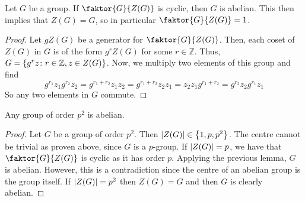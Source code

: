 \begin{lemma}
	Let \( G \) be a group.
	If \( \faktor{G}{Z(G)} \) is cyclic, then \( G \) is abelian.
	This then implies that \( Z(G) = G \), so in particular \( \faktor{G}{Z(G)} = 1 \).
\end{lemma}
\begin{proof}
	Let \( g Z(G) \) be a generator for \( \faktor{G}{Z(G)} \).
	Then, each coset of \( Z(G) \) in \( G \) is of the form \( g^r Z(G) \) for some \( r \in \mathbb Z \).
	Thus, \( G = \qty{g^r z \colon r \in \mathbb Z, z \in Z(G)} \).
	Now, we multiply two elements of this group and find
	\[ g^{r_1} z_1 g^{r_2} z_2 = g^{r_1 + r_2} z_1 z_2 = g^{r_1 + r_2} z_2 z_1 = z_2 z_1 g^{r_1 + r_2} = g^{r_2} z_2 g^{r_1} z_1 \]
	So any two elements in \( G \) commute.
\end{proof}
\begin{corollary}
	Any group of order \( p^2 \) is abelian.
\end{corollary}
\begin{proof}
	Let \( G \) be a group of order \( p^2 \).
	Then \( \abs{Z(G)} \in \qty{1, p, p^2} \).
	The centre cannot be trivial as proven above, since \( G \) is a \( p \)-group.
	If \( \abs{Z(G)} = p \), we have that \( \faktor{G}{Z(G)} \) is cyclic as it has order \( p \).
	Applying the previous lemma, \( G \) is abelian.
	However, this is a contradiction since the centre of an abelian group is the group itself.
	If \( \abs{Z(G)} = p^2 \) then \( Z(G) = G \) and then \( G \) is clearly abelian.
\end{proof}

